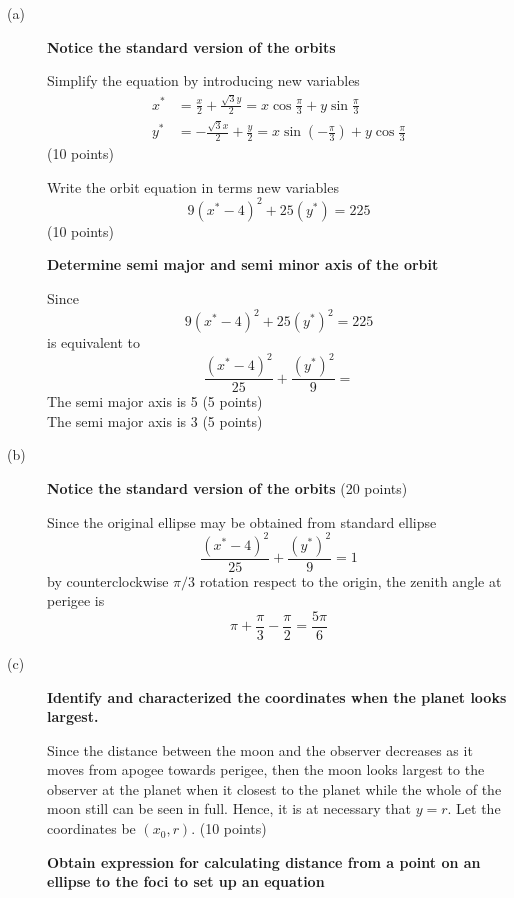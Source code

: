 \begin{description}
\item[(a)] \textbf{Notice the standard version of the orbits}

  Simplify the equation by introducing new variables
  \begin{align*}
    x^* &= \frac{x}{2} + \frac{\sqrt{3}y}{2}
      = x\cos\frac{\pi}{3} + y\sin\frac{\pi}{3} \\
    y^* &= -\frac{\sqrt{3}x}{2} + \frac{y}{2}
      = x\sin\left(-\frac{\pi}{3}\right) + y\cos\frac{\pi}{3}
  \end{align*}
  \hfill(10 points)

  Write the orbit equation in terms new variables
  \[
    9(x^* - 4)^2 + 25(y^*) = 225
  \]
  \hfill(10 points)

  \textbf{Determine semi major and semi minor axis of the orbit}

  Since
  \[
    9(x^* - 4)^2 + 25(y^*)^2 = 225
  \]
  is equivalent to
  \[
    \frac{(x^* - 4)^2}{25} + \frac{(y^*)^2}{9} =
  \]
  The semi major axis is 5 \hfill(5 points) \\
  The semi major axis is 3 \hfill(5 points) %

\item[(b)] \textbf{Notice the standard version of the orbits} \hfill(20 points)

  Since the original ellipse may be obtained from standard ellipse
  \[
    \frac{(x^* - 4)^2}{25} + \frac{(y^*)^2}{9} = 1
  \]
  by counterclockwise $\pi/3$ rotation respect to the origin, the zenith angle
  at perigee is
  \[
    \pi + \frac{\pi}{3} - \frac{\pi}{2} = \frac{5\pi}{6}
  \]

\item[(c)] \textbf{Identify and characterized the coordinates when the planet
  looks largest.} %

  Since the distance between the moon and the observer decreases as it moves
  from apogee towards perigee, then the moon looks largest to the observer at
  the planet when it closest to the planet while the whole of the moon still
  can be seen in full. Hence, it is at necessary that $y = r$. Let the %
  coordinates be $(x_0, r)$. \hfill(10 points)


  \textbf{Obtain expression for calculating distance from a point on an
  ellipse to the foci to set up an equation}


\end{description}
